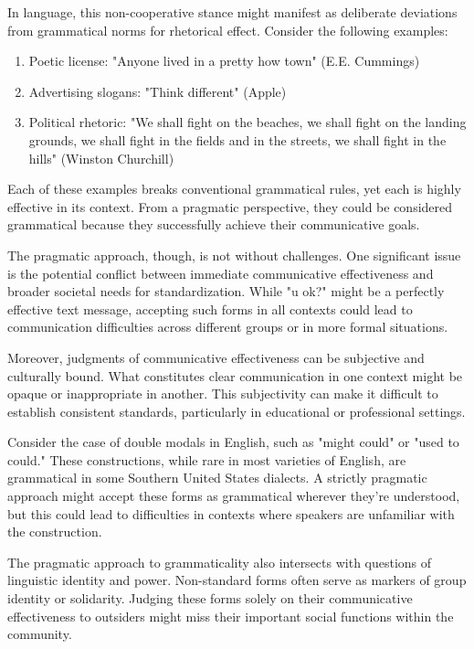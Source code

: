 In language, this non-cooperative stance might manifest as deliberate deviations from grammatical norms for rhetorical effect. Consider the following examples:

\begin{enumerate}
    \item Poetic license: "Anyone lived in a pretty how town" (E.E. Cummings)
    \item Advertising slogans: "Think different" (Apple)
    \item Political rhetoric: "We shall fight on the beaches, we shall fight on the landing grounds, we shall fight in the fields and in the streets, we shall fight in the hills" (Winston Churchill)
\end{enumerate}

Each of these examples breaks conventional grammatical rules, yet each is highly effective in its context. From a pragmatic perspective, they could be considered grammatical because they successfully achieve their communicative goals.

\bigskip


The pragmatic approach, though, is not without challenges. One significant issue is the potential conflict between immediate communicative effectiveness and broader societal needs for standardization. While "u ok?" might be a perfectly effective text message, accepting such forms in all contexts could lead to communication difficulties across different groups or in more formal situations.

Moreover, judgments of communicative effectiveness can be subjective and culturally bound. What constitutes clear communication in one context might be opaque or inappropriate in another. This subjectivity can make it difficult to establish consistent standards, particularly in educational or professional settings.

Consider the case of double modals in English, such as "might could" or "used to could." These constructions, while rare in most varieties of English, are grammatical in some Southern United States dialects. A strictly pragmatic approach might accept these forms as grammatical wherever they're understood, but this could lead to difficulties in contexts where speakers are unfamiliar with the construction.

The pragmatic approach to grammaticality also intersects with questions of linguistic identity and power. Non-standard forms often serve as markers of group identity or solidarity. Judging these forms solely on their communicative effectiveness to outsiders might miss their important social functions within the community.

